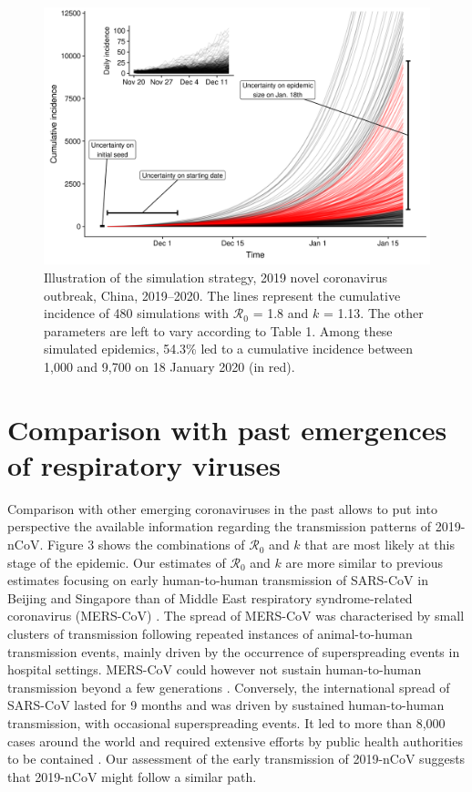 \documentclass{article}
\begin{document}
\begin{figure}[t]
	\centering
	\includegraphics[width=.95\linewidth]{../figure/fig_traj.png}
	\caption{Illustration of the simulation strategy, 2019 novel coronavirus outbreak, China, 2019–2020. The lines represent the cumulative incidence of 480 simulations with $\mathcal{R}_0$ = 1.8 and $k$ = 1.13. The other parameters are left to vary according to Table 1. Among these simulated epidemics, 54.3\% led to a cumulative incidence between 1,000 and 9,700 on 18 January 2020 (in red).}

	\label{fig:fig_traj}
\end{figure}

\section*{Comparison with past emergences of respiratory viruses}

Comparison with other emerging coronaviruses in the past allows to put into perspective the available information regarding the transmission patterns of 2019-nCoV. Figure 3 shows the combinations of $\mathcal{R}_0$ and $k$ that are most likely at this stage of the epidemic. Our estimates of $\mathcal{R}_0$ and $k$ are more similar to previous estimates focusing on early human-to-human transmission of SARS-CoV in Beijing and Singapore \cite{Lloyd-Smith:2005} than of Middle East respiratory syndrome-related coronavirus (MERS-CoV) \cite{Kucharski:2015b}. The spread of MERS-CoV was characterised by small clusters of transmission following repeated instances of animal-to-human transmission events, mainly driven by the occurrence of superspreading events in hospital settings. MERS-CoV could however not sustain human-to-human transmission beyond a few generations \cite{breban2013interhuman}. Conversely, the international spread of SARS-CoV lasted for 9 months and was driven by sustained human-to-human transmission, with occasional superspreading events. It led to more than 8,000 cases around the world and required extensive efforts by public health authorities to be contained \cite{cowling2008effectiveness}. Our assessment of the early transmission of 2019-nCoV suggests that 2019-nCoV might follow a similar path.
\end{document}
